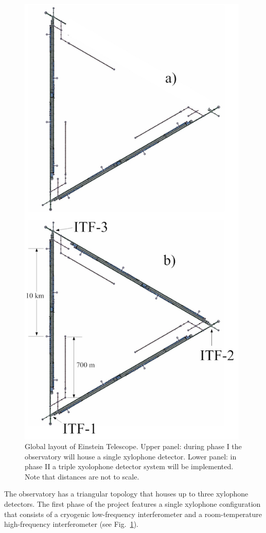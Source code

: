 \begin{figure}[htbp!]
\centering
\includegraphics[width=11cm]{./Sec_SiteInfra/Figures/infra1.jpg}
\caption{Global layout of Einstein Telescope. Upper panel: during phase I the observatory will house a single xylophone detector. Lower panel: in phase II a triple xyolophone detector system will be implemented. Note that distances are not to scale.}
\label{fig:infra1}
\end{figure}
The observatory has a triangular topology that houses up to three xylophone detectors. The first phase of the project features a single xylophone configuration that consists of a cryogenic low-frequency interferometer and a room-temperature high-frequency  interferometer (see Fig.~\ref{fig:infra1}).


